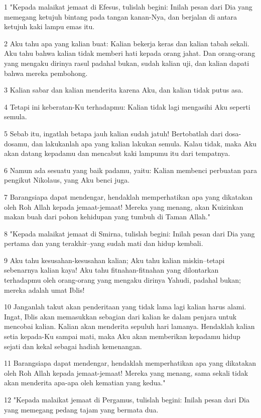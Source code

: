 \par 1 "Kepada malaikat jemaat di Efesus, tulislah begini: Inilah pesan dari Dia yang memegang ketujuh bintang pada tangan kanan-Nya, dan berjalan di antara ketujuh kaki lampu emas itu.
\par 2 Aku tahu apa yang kalian buat: Kalian bekerja keras dan kalian tabah sekali. Aku tahu bahwa kalian tidak memberi hati kepada orang jahat. Dan orang-orang yang mengaku dirinya rasul padahal bukan, sudah kalian uji, dan kalian dapati bahwa mereka pembohong.
\par 3 Kalian sabar dan kalian menderita karena Aku, dan kalian tidak putus asa.
\par 4 Tetapi ini keberatan-Ku terhadapmu: Kalian tidak lagi mengasihi Aku seperti semula.
\par 5 Sebab itu, ingatlah betapa jauh kalian sudah jatuh! Bertobatlah dari dosa-dosamu, dan lakukanlah apa yang kalian lakukan semula. Kalau tidak, maka Aku akan datang kepadamu dan mencabut kaki lampumu itu dari tempatnya.
\par 6 Namun ada sesuatu yang baik padamu, yaitu: Kalian membenci perbuatan para pengikut Nikolaus, yang Aku benci juga.
\par 7 Barangsiapa dapat mendengar, hendaklah memperhatikan apa yang dikatakan oleh Roh Allah kepada jemaat-jemaat! Mereka yang menang, akan Kuizinkan makan buah dari pohon kehidupan yang tumbuh di Taman Allah."
\par 8 "Kepada malaikat jemaat di Smirna, tulislah begini: Inilah pesan dari Dia yang pertama dan yang terakhir--yang sudah mati dan hidup kembali.
\par 9 Aku tahu kesusahan-kesusahan kalian; Aku tahu kalian miskin--tetapi sebenarnya kalian kaya! Aku tahu fitnahan-fitnahan yang dilontarkan terhadapmu oleh orang-orang yang mengaku dirinya Yahudi, padahal bukan; mereka adalah umat Iblis!
\par 10 Janganlah takut akan penderitaan yang tidak lama lagi kalian harus alami. Ingat, Iblis akan memasukkan sebagian dari kalian ke dalam penjara untuk mencobai kalian. Kalian akan menderita sepuluh hari lamanya. Hendaklah kalian setia kepada-Ku sampai mati, maka Aku akan memberikan kepadamu hidup sejati dan kekal sebagai hadiah kemenangan.
\par 11 Barangsiapa dapat mendengar, hendaklah memperhatikan apa yang dikatakan oleh Roh Allah kepada jemaat-jemaat! Mereka yang menang, sama sekali tidak akan menderita apa-apa oleh kematian yang kedua."
\par 12 "Kepada malaikat jemaat di Pergamus, tulislah begini: Inilah pesan dari Dia yang memegang pedang tajam yang bermata dua.
